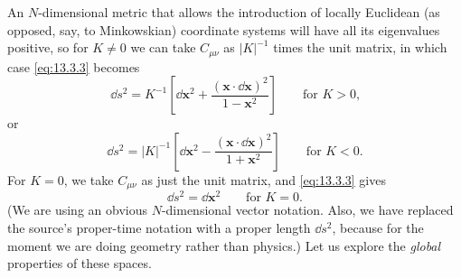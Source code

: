 An \(N\)-dimensional metric that allows the introduction of locally Euclidean
(as opposed, say, to Minkowskian) coordinate systems will have all its
eigenvalues positive, so for \(K\neq0\) we can take \(C_{\mu\nu}\) as
\(\lvert K\rvert^{-1}\) times the unit matrix, in which case
\eqref{eq:13.3.3} becomes
\begin{equation}
  \dd s^2
  =
  K^{-1}
  \left[
    \dd\mathbf{x}^2
    +
    \frac{(\mathbf{x}\cdot\dd\mathbf{x})^2}{1-\mathbf{x}^2}
  \right]
  \qquad\text{for \(K>0\),}
  \tag{13.3.23}\label{eq:13.3.23}
\end{equation}
or
\begin{equation}
  \dd s^2
  =
  \lvert K\rvert^{-1}
  \left[
    \dd\mathbf{x}^2
    -\frac{(\mathbf{x}\cdot\dd\mathbf{x})^2}{1+\mathbf{x}^2}
  \right]
  \qquad\text{for \(K<0\).}
  \tag{13.3.24}\label{eq:13.3.24}
\end{equation}
For \(K=0\), we take \(C_{\mu\nu}\) as just the unit matrix, and
\eqref{eq:13.3.3} gives
\begin{equation}
  \dd s^2=\dd\mathbf{x}^2
  \qquad\text{for \(K=0\).}
  \tag{13.3.25}\label{eq:13.3.25}
\end{equation}
(We are using an obvious \(N\)-dimensional vector notation. Also, we have
replaced the source's proper-time notation with a proper length
\(\dd s^2\), because for the moment we are doing geometry rather than
physics.) Let us explore the \emph{global} properties of these spaces.

